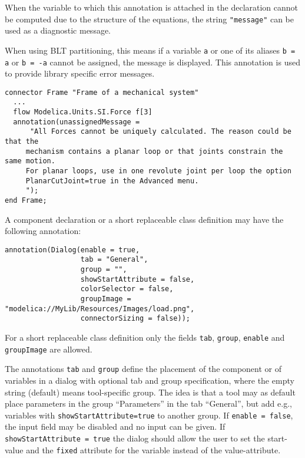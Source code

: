 When the variable to which this annotation is attached in the declaration cannot be computed due to the structure of the equations, the string \lstinline!"message"! can be used as a diagnostic message.

\begin{nonnormative}
When using BLT partitioning, this means if a variable \lstinline!a! or one of its aliases \lstinline!b = a! or \lstinline!b = -a!
cannot be assigned, the message is displayed.  This annotation is used to provide library specific error messages.
\end{nonnormative}

\begin{example}
\begin{lstlisting}[language=modelica]
connector Frame "Frame of a mechanical system"
  ...
  flow Modelica.Units.SI.Force f[3]
  annotation(unassignedMessage =
      "All Forces cannot be uniquely calculated. The reason could be that the
     mechanism contains a planar loop or that joints constrain the same motion.
     For planar loops, use in one revolute joint per loop the option
     PlanarCutJoint=true in the Advanced menu.
     ");
end Frame;
\end{lstlisting}
\end{example}

A component declaration or a short replaceable class definition may have the following annotation:
\begin{lstlisting}[language=modelica]
annotation(Dialog(enable = true,
                  tab = "General",
                  group = "",
                  showStartAttribute = false,
                  colorSelector = false,
                  groupImage = "modelica://MyLib/Resources/Images/load.png",
                  connectorSizing = false));
\end{lstlisting}
For a short replaceable class definition only the fields \lstinline!tab!, \lstinline!group!, \lstinline!enable! and \lstinline!groupImage! are allowed.

The annotations \lstinline!tab! and \lstinline!group! define the placement of
the component or of variables in a dialog with optional tab and group
specification, where the empty string (default) means tool-specific group.
The idea is that a tool may as default place parameters in the group ``Parameters'' in the tab ``General'',
but add e.g., variables with \lstinline!showStartAttribute=true! to another group.
If \lstinline!enable = false!, the input field may
be disabled and no input can be given. If \lstinline!showStartAttribute = true! the dialog should allow the user to
set the start-value and the \lstinline!fixed! attribute for the variable instead of the value-attribute.

